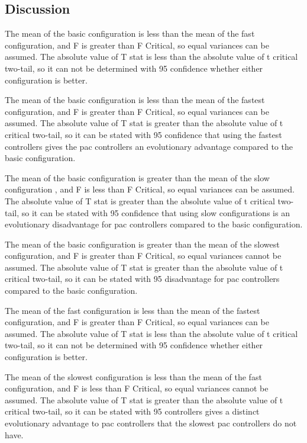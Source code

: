 \documentclass{article}
\newcommand\tab[1][1cm]{\hspace*{#1}}
\begin{document}
\clearpage
\subsection{Discussion}
\begin{flushleft}
\tab
The mean of the basic configuration is less than the mean of the fast
configuration, and F is greater than F Critical,
so equal variances can be assumed. The absolute value of T stat is less than the
 absolute value of t critical two-tail, so it can not be determined with 95%
 confidence whether either configuration is better.

\tab
The mean of the basic configuration is less than the mean of the fastest
 configuration, and F is greater than F Critical,
 so equal variances can be assumed. The absolute value of T stat is greater
 than the absolute value of t critical two-tail, so it can be stated with 95%
 confidence that using the fastest controllers gives the pac controllers an
 evolutionary advantage compared to the basic configuration.

\tab
The mean of the basic configuration is greater than the mean of the slow
 configuration , and F is less than F Critical,
 so equal variances can be assumed. The absolute value of T stat is greater
 than the absolute value of t critical two-tail, so it can be stated with 95%
 confidence that using slow configurations is an evolutionary disadvantage for
 pac controllers compared to the basic configuration.

\tab
The mean of the basic configuration is greater than the
 mean of the slowest configuration, and F is greater than F
 Critical, so equal variances cannot be assumed. The absolute value of T stat is
 greater than the absolute value of t critical two-tail, so it can be stated
 with 95%
 disadvantage for pac controllers compared to the basic configuration.

\tab
The mean of the fast configuration is less than the mean
 of the fastest configuration, and F is greater
 than F Critical, so equal variances can be assumed. The absolute value of T stat is less than the
  absolute value of t critical two-tail, so it can not be determined with 95%
  confidence whether either configuration is better.

\tab
The mean of the slowest configuration is less than the mean
 of the fast configuration, and F is less
 than F Critical, so equal variances cannot be assumed. The absolute value of T
 stat is greater than the absolute value of t critical two-tail, so it can be
 stated with 95%
 controllers gives a distinct evolutionary advantage to pac controllers that
 the slowest pac controllers do not have.


\end{flushleft}
\end{document}
